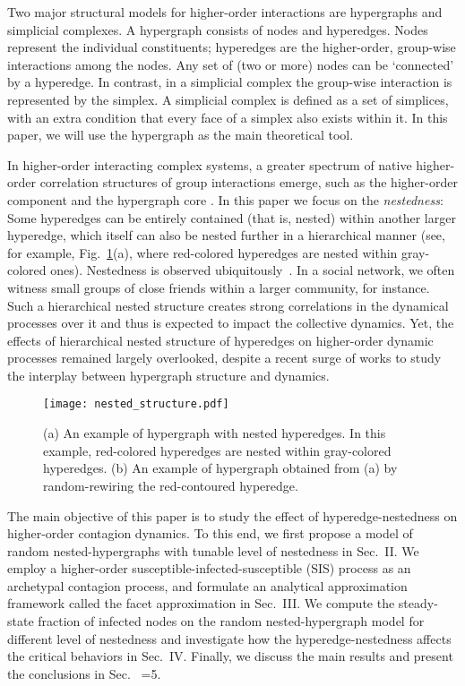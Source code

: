 \documentclass[aps,pre,twocolumn,nofootinbib,superscriptaddress,showpacs,showkeys]{revtex4-1}
\def\BigRoman{\uppercase\expandafter{\romannumeral\number\count 255 }}
\def\Romannumeral{\afterassignment\BigRoman\count255=}
\begin{document}
Two major structural models for higher-order interactions are hypergraphs and simplicial complexes. 
A hypergraph consists of nodes and hyperedges. Nodes represent the individual constituents; hyperedges are the higher-order, group-wise interactions among the nodes. Any set of (two or more) nodes can be `connected' by a hyperedge. In contrast, in a simplicial complex the group-wise interaction is represented by the simplex. A simplicial complex  is defined as a set of simplices, with an extra condition that every face of a simplex also exists within it. In this paper, we will use the hypergraph as the main theoretical tool. 

In higher-order interacting complex systems, a greater spectrum of native higher-order correlation structures of group interactions emerge, such as the higher-order component \cite{jungho} and the hypergraph core \cite{kq}. In this paper we focus on the {\it nestedness}: Some hyperedges can be entirely contained (that is, nested) within another larger hyperedge, which itself can also be nested further in a hierarchical manner (see, for example, Fig.~\ref{fig:rewiring}(a), where red-colored hyperedges are nested within gray-colored ones). Nestedness is observed ubiquitously~\cite{motif}. In a social network, we often witness small groups of close friends within a larger community, for instance. Such a hierarchical nested structure creates strong correlations in the dynamical processes over it and thus is expected to impact the collective dynamics.  
Yet, the effects of hierarchical nested structure of hyperedges on higher-order dynamic processes remained largely overlooked, despite a recent surge of works  \cite{SCM,r26,r28,r29,hypergraph,r27,st2021social,universal,cca,st2022influential,jungho} to study the interplay between hypergraph structure and dynamics. 

\begin{figure}[b]
\centering
\texttt{[image: nested\_structure.pdf]}
\caption{(a) An example of hypergraph with nested hyperedges. In this example, red-colored hyperedges are nested within gray-colored hyperedges. 
(b) An example of hypergraph obtained from (a) by random-rewiring the red-contoured hyperedge. 
}
    \label{fig:rewiring}
\end{figure}

The main objective of this paper is to study the effect of hyperedge-nestedness on higher-order contagion dynamics. To this end, we 
first propose a model of random nested-hypergraphs with tunable level of nestedness in Sec.~II. 
We employ a higher-order susceptible-infected-susceptible (SIS) process \cite{st2022influential} as an archetypal contagion process,
and formulate an analytical approximation framework called the facet approximation in Sec.~III.  
We compute the steady-state fraction of infected nodes on the random nested-hypergraph model for different level of nestedness and investigate how the hyperedge-nestedness affects the critical behaviors in Sec.~IV. 
Finally, we discuss the main results and present the conclusions in Sec.~{\Romannumeral 5}.
\end{document}
